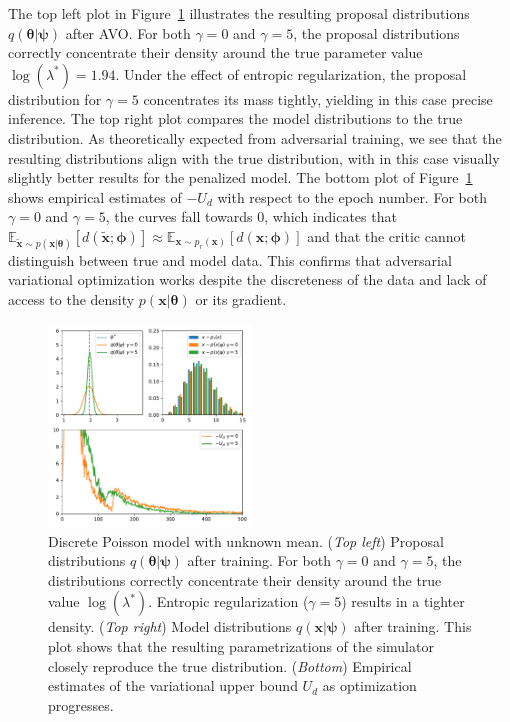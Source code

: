 \documentclass{article}
\newcommand{\qxpsi}{q(\mathbf{x}|\bfpsi)}
\newcommand{\bftheta}{{\bm \theta}}
\newcommand{\bfpsi}{{\bm \psi}}
\newcommand{\bfphi}{{\bm \phi}}
\newcommand{\bfx}{\mathbf{x}}
\theoremstyle{plain}
\begin{document}
The top left plot in Figure~\ref{fig:poisson} illustrates the resulting proposal
distributions $q(\bftheta|\bfpsi)$ after AVO.  For
both $\gamma=0$ and $\gamma=5$, the proposal distributions correctly concentrate
their density around the true parameter value $\log(\lambda^*) = 1.94$. Under
the effect of entropic regularization,
the proposal distribution for $\gamma=5$ concentrates its mass tightly,
yielding in this case precise inference.  The top right plot compares the
model distributions to the true distribution.  As theoretically expected from
adversarial training, we see that the resulting distributions align with
the true distribution, with in this case visually slightly better results for the penalized
model.  The bottom plot of Figure~\ref{fig:poisson} shows empirical estimates
of $-U_d$ with respect to the epoch number. For both $\gamma=0$ and $\gamma=5$,
the curves fall towards $0$, which indicates that
$\mathbb{E}_{\tilde{\mathbf{x}} \sim p(\mathbf{x}|\bftheta)}
[d(\tilde{\mathbf{x}};\bfphi)] \approx \mathbb{E}_{\mathbf{x} \sim
p_r(\mathbf{x})} [d(\mathbf{x};\bfphi)]$ and that the critic cannot distinguish
between true and model data. This confirms that adversarial variational optimization
works despite the discreteness of the data and lack of access to the
density $p(\bfx | \bftheta)$ or its gradient.

\begin{figure}[h]
\centering
\includegraphics[width=0.48\textwidth]{figures/poisson.pdf}
\caption{Discrete Poisson model with unknown mean.
 ({\it Top left}) Proposal distributions $q(\bftheta|\bfpsi)$ after training. For both $\gamma=0$ and $\gamma=5$, the distributions correctly concentrate their density around
            the true value $\log(\lambda^*)$. Entropic regularization ($\gamma=5$) results in a tighter density.
 ({\it Top right}) Model distributions $\qxpsi$ after training. This plot shows that the resulting parametrizations of the simulator closely reproduce the true distribution.
 ({\it Bottom}) Empirical estimates of the variational upper bound $U_d$ as optimization progresses.
 }\label{fig:poisson}
\end{figure}
\end{document}
